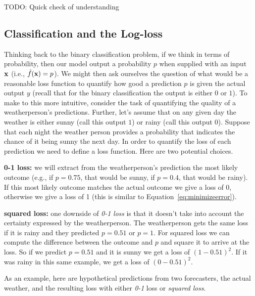 \documentclass[assignment03_Solutions]{subfiles}
\begin{document}
\begin{exercise}
TODO: Quick check of understanding
\end{exercise}

\subsection{Classification and the Log-loss}
Thinking back to the binary classification problem, if we think in terms of probability, then our model output a probability $p$ when supplied with an input $\mathbf{x}$ (i.e., $\hat{f}(\mathbf{x}) = p$).  We might then ask ourselves the question of what would be a reasonable loss function to quantify how good a prediction $p$ is given the actual output $y$ (recall that for the binary classification the output is either $0$ or $1$).  To make to this more intuitive, consider the task of quantifying the quality of a weatherperson's predictions.  Further, let's assume that on any given day the weather is either sunny (call this output $1$) or rainy (call this output $0$).  Suppose that each night the weather person provides a probability that indicates the chance of it being sunny the next day.  In order to quantify the loss of each prediction we need to define a loss function.  Here are two potential choices.
\be
\item \textbf{0-1 loss:} we will extract from the weatherperson's prediction the most likely outcome (e.g., if $p = 0.75$, that would be sunny, if $p = 0.4$, that would be rainy).  If this most likely outcome matches the actual outcome we give a loss of 0, otherwise we give a loss of 1 (this is similar to Equation~\ref{eq:minimizeerror}).
\item \textbf{squared loss:} one downside of \emph{0-1 loss} is that it doesn't take into account the certainty expressed by the weatherperson.  The weatherperson gets the same loss if it is rainy and they predicted $p = 0.51$ or $p = 1$.  For squared loss we can compute the difference between the outcome and $p$ and square it to arrive at the loss.  So if we predict $p = 0.51$ and it is sunny we get a loss of $(1 - 0.51)^2$.  If it was rainy in this same example, we get a loss of $(0 - 0.51)^2$.
\ee

As an example, here are hypothetical predictions from two forecasters, the actual weather, and the resulting loss with either \emph{0-1} loss or \emph{squared loss}.
\end{document}

